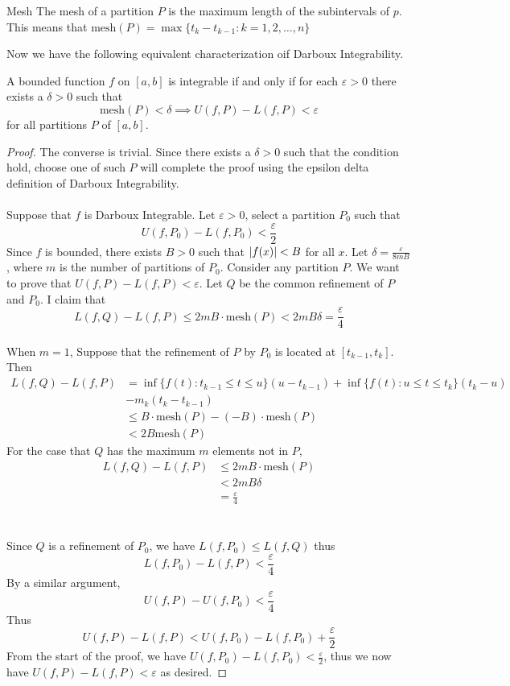 \documentclass[a4paper]{article}
\begin{document}
\begin{defn}{Mesh}{} The mesh of a partition $P$ is the maximum length of the subintervals of $p$. This means that $\text{mesh}(P)=\max\{t_k-t_{k-1}:k=1,2,\dots,n\}$
\end{defn}

Now we have the following equivalent characterization oif Darboux Integrability. 

\begin{thm}{}{} A bounded function $f$ on $[a,b]$ is integrable if and only if for each $\varepsilon>0$ there exists a $\delta>0$ such that $$\text{mesh}(P)<\delta\implies U(f,P)-L(f,P)<\varepsilon$$ for all partitions $P$ of $[a,b]$. \tcbline
\begin{proof} The converse is trivial. Since there exists a $\delta>0$ such that the condition hold, choose one of such $P$ will complete the proof using the epsilon delta definition of Darboux Integrability. \\~\\
Suppose that $f$ is Darboux Integrable. Let $\varepsilon>0$, select a partition $P_0$ such that $$U(f,P_0)-L(f,P_0)<\frac{\varepsilon}{2}$$ Since $f$ is bounded, there exists $B>0$ such that $\abs{f(x)}<B$ for all $x$. Let $\delta
=\frac{\varepsilon}{8mB}$, where $m$ is the number of partitions of $P_0$. Consider any partition $P$. We want to prove that $U(f,P)-L(f,P)<\varepsilon$. Let $Q$ be the common refinement of $P$ and $P_0$. I claim that $$L(f,Q)-L(f,P)\leq 2mB\cdot\text{mesh}(P)<2mB\delta=\frac{\varepsilon}{4}$$\\
When $m=1$, Suppose that the refinement of $P$ by $P_0$ is located at $[t_{k-1},t_k]$. Then 
\begin{align*}
L(f,Q)-L(f,P)&=\inf\{f(t):t_{k-1}\leq t\leq u\}(u-t_{k-1})+\inf\{f(t):u\leq t\leq t_k\}(t_k-u)\\
&-m_k(t_k-t_{k-1})\\
&\leq B\cdot\text{mesh}(P)-(-B)\cdot\text{mesh}(P)\tag{$-B$ is a minimum of $f(x)$}\\
&<2B\text{mesh}(P)
\end{align*}
For the case that $Q$ has the maximum $m$ elements not in $P$, 
\begin{align*}
L(f,Q)-L(f,P)&\leq 2mB\cdot\text{mesh}(P)\tag{Same argument as the case for $m=1$}\\
&<2mB\delta\\
&=\frac{\varepsilon}{4}\tag{constructed $\delta$}
\end{align*}
\\~\\
Since $Q$ is a refinement of $P_0$, we have $L(f,P_0)\leq L(f,Q)$ thus $$L(f,P_0)-L(f,P)<\frac{\varepsilon}{4}$$ By a similar argument, $$U(f,P)-U(f,P_0)<\frac{\varepsilon}{4}$$
Thus $$U(f,P)-L(f,P)<U(f,P_0)-L(f,P_0)+\frac{\varepsilon}{2}$$ From the start of the proof, we have $U(f,P_0)-L(f,P_0)<\frac{\varepsilon}{2}$, thus we now have $U(f,P)-L(f,P)<\varepsilon$ as desired. 
\end{proof}
\end{thm}
\end{document}
